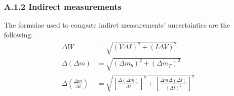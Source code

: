 \documentclass[a4paper, 12pt]{article}
\begin{document}
\subsubsection{A.1.2 Indirect measurements}
The formulae used to compute indiret measurements' uncertainties are the following:
\begin{align}\label{dp}
	\Delta W &= \sqrt{(V\Delta I)^2 + (I \Delta V)^2} \\
	\Delta (\Delta m) &= \sqrt{(\Delta m_b)^2 + (\Delta m_T)^2} \\
	\Delta \left(\frac{\Delta m}{\Delta t}\right) &= \sqrt{\left[\frac{\Delta (\Delta m)}{\Delta t}\right]^2 + \left[\frac{\Delta m \Delta (\Delta t)}{(\Delta t)^2}\right]^2}
\end{align}
\end{document}
